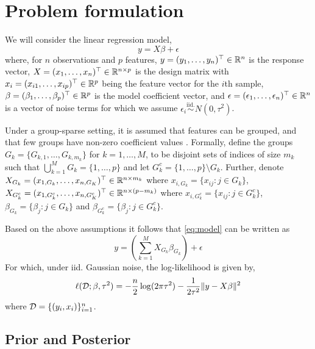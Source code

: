 \newpage
\section{Problem formulation}

We will consider the linear regression model,
\begin{equation} \label{eq:model} 
    y = X \beta + \epsilon
\end{equation}
where, for $n$ observations and $p$ features, $y = (y_1, \dots, y_n)^\top \in \mathbb{R}^n$ is the response vector, $X = (x_1, \dots, x_n)^\top \in \mathbb{R}^{n \times p}$ is the design matrix with $x_i = (x_{i1}, \dots, x_{ip})^\top \in \mathbb{R}^p$ being the feature vector for the $i$th sample, $\beta = (\beta_1, \dots, \beta_p)^\top \in \mathbb{R}^p$ is the model coefficient vector, and $\epsilon = (\epsilon_1, \dots, \epsilon_n)^\top \in \mathbb{R}^n$ is a vector of noise terms for which we assume $\epsilon_i \overset{\text{iid.}}{\sim} N(0, \tau^2)$. 

Under a group-sparse setting, it is assumed that features can be grouped, and that few groups have non-zero coefficient values \citep{Giraud2021}. Formally, define the groups $G_k = \{ G_{k,1}, \dots, G_{k, m_k} \}$ for $k=1,\dots,M$, to be disjoint sets of indices of size $m_k$ such that $ \bigcup_{k=1}^M G_k = \{1, \dots, p \}$ and let $G_k^c = \{1,\dots, p \} \setminus G_k$. Further, denote $X_{G_k} = (x_{1, G_k}, \dots, x_{n, G_K})^\top \in \mathbb{R}^{n \times m_k}$ where $x_{i, G_k} = \{x_{ij} : j \in G_k \}$,
$X_{G_k^c} = (x_{1, G_k^c}, \dots, x_{n, G_K^c})^\top \in \mathbb{R}^{n \times (p - m_k)}$ where $x_{i, G_k^c} = \{x_{ij} : j \in G_k^c \}$, $\beta_{G_k} = \{\beta_j : j \in G_k \}$ and $\beta_{G_k^c} = \{ \beta_j : j \in G_k^c \}$.

Based on the above assumptions it follows that \eqref{eq:model} can be written as
\begin{equation}
    y = \left( \sum_{k=1}^{M} X_{G_k} \beta_{G_k} \right) + \epsilon
\end{equation}
For which, under iid. Gaussian noise, the log-likelihood is given by,
\begin{equation} \label{eq:log-likelihood}
    \ell(\mathcal{D}; \beta, \tau^2) = - \frac{n}{2}\log(2\pi\tau^2) - \frac{1}{2\tau^2} \| y - X \beta \|^2 
\end{equation}
where $\mathcal{D} = \{ (y_i, x_i) \}_{i=1}^n$.


\subsection{Prior and Posterior}

